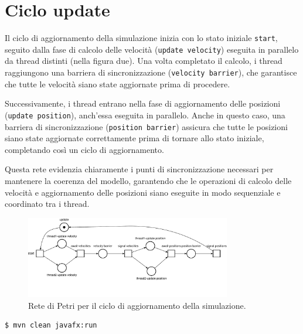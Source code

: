 \documentclass[a4paper,12pt]{report}
\begin{document}
    \section{Ciclo update}
        Il ciclo di aggiornamento della simulazione inizia con lo stato iniziale \texttt{start}, seguito dalla fase di calcolo delle velocità (\texttt{update velocity}) eseguita in parallelo da thread distinti (nella figura due). Una volta completato il calcolo, i thread raggiungono una barriera di sincronizzazione (\texttt{velocity barrier}), che garantisce che tutte le velocità siano state aggiornate prima di procedere.
        
        Successivamente, i thread entrano nella fase di aggiornamento delle posizioni (\texttt{update position}), anch'essa eseguita in parallelo. Anche in questo caso, una barriera di sincronizzazione (\texttt{position barrier}) assicura che tutte le posizioni siano state aggiornate correttamente prima di tornare allo stato iniziale, completando così un ciclo di aggiornamento.
        
        Questa rete evidenzia chiaramente i punti di sincronizzazione necessari per mantenere la coerenza del modello, garantendo che le operazioni di calcolo delle velocità e aggiornamento delle posizioni siano eseguite in modo sequenziale e coordinato tra i thread.
        
        \begin{figure}[h!]
            \centering
            \includegraphics[width=0.8\textwidth]{petri_nets_pdf/rete_update_cycle.pdf}
            \caption{Rete di Petri per il ciclo di aggiornamento della simulazione.}
            \label{fig:rete_update_cycle}
        \end{figure}

        \begin{lstlisting}[style=bash, caption={Avvio dello script}]
            $ mvn clean javafx:run
        \end{lstlisting}
    
    
\end{document}
